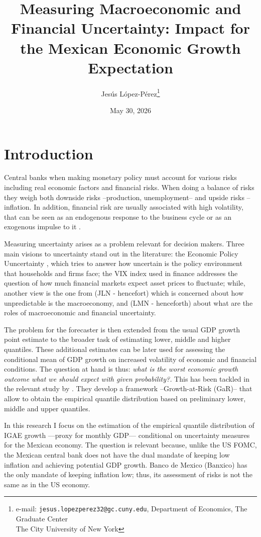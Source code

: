 \documentclass[12pt]{article}
\title{Measuring Macroeconomic and Financial Uncertainty: Impact for the Mexican Economic Growth Expectation}
\author{Jes\'us L\'opez-P\'erez\thanks{e-mail: \texttt{jesus.lopezperez32@gc.cuny.edu}, Department of Economics, The Graduate Center\\ The City University of New York}}
\date{May 30, 2026}
\begin{document}
\maketitle


\section{Introduction}
Central banks when making monetary policy must account for various risks including real economic factors and financial risks. When doing a balance of risks they weigh both downside risks --production, unemployment-- and upside risks --inflation. In addition, financial risk are usually associated with high volatility, that can be seen as an endogenous response to the business cycle or as an exogenous impulse to it \citep{ludvigson2021uncertainty}. 

Measuring uncertainty arises as a problem relevant for decision makers. Three main visions to uncertainty stand out in the literature: the Economic Policy Uuncertainty \cite{baker2016measuring}, which tries to answer how uncertain is the policy environment that households and firms face; the VIX index used in finance addresses the question of how much financial markets expect asset prices to fluctuate; while, another view is the one from \cite{jurado2015measuring} (JLN - hencefort) which is concerned about how unpredictable is the macroeconomy, and \cite{ludvigson2021uncertainty} (LMN - henceforth) about what are the roles of macroeconomic and financial uncertainty.

The problem for the forecaster is then extended from the usual GDP growth point estimate to the broader task of estimating lower, middle and higher quantiles. These additional estimates can be later used for assessing the conditional mean of GDP growth on increased volatility of economic and financial conditions. The question at hand is thus:\textit{ what is the worst economic growth outcome what we should expect with given probability?.} This has been tackled in the relevant study by \cite{adrian2019vulnerable}. They develop a framework --Growth-at-Risk (GaR)-- that allow to obtain the empirical quantile distribution based on preliminary lower, middle and upper quantiles. 

In this research I focus on the estimation of the empirical quantile distribution of IGAE growth ---proxy for monthly GDP--- conditional on uncertainty measures for the Mexican economy. The question is relevant because, unlike the US FOMC, the Mexican central bank does not have the dual mandate of keeping low inflation and achieving potential GDP growth. Banco de Mexico (Banxico) has the only mandate of keeping inflation low; thus, its assessment of risks is not the same as in the US economy.
\end{document}
